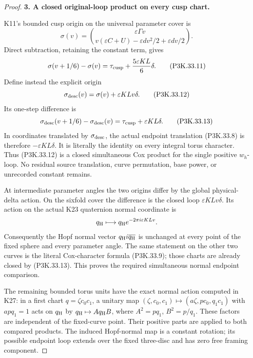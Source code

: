 \begin{proof}
\par\medskip\noindent\textbf{3. A closed original-loop product on every cusp chart.}\enspace

K11's bounded cusp origin on the universal parameter cover is
\[
 \sigma(v)=
 \binom{\varepsilon\Gamma v}
       {v(\varepsilon C+U)-\varepsilon dv^2/2+\varepsilon dv/2}.
\]
Direct subtraction, retaining the constant term, gives
\[
 \sigma(v+1/6)-\sigma(v)
      =\tau_{\rm cusp}+\frac{5\varepsilon KL}{6}\delta. \tag{P3K.33.11}
\]
Define instead the explicit origin
\[
             \sigma_{\rm desc}(v)=\sigma(v)+\varepsilon KLv\delta.
                                                               \tag{P3K.33.12}
\]
Its one-step difference is
\[
 \sigma_{\rm desc}(v+1/6)-\sigma_{\rm desc}(v)
                    =\tau_{\rm cusp}+\varepsilon KL\delta. \tag{P3K.33.13}
\]
In coordinates translated by \(\sigma_{\rm desc}\), the actual
endpoint translation (P3K.33.8) is therefore \(-\varepsilon KL\delta\).
It is literally the identity on every integral torus character.
Thus (P3K.33.12) is a closed simultaneous Cox product for the single
positive \(w_h\)-loop. No residual source translation, curve
permutation, base power, or unrecorded constant remains.

At intermediate parameter angles the two origins differ by the
global physical-delta action. On the sixfold cover the difference
is the closed loop \(\varepsilon KLv\delta\). Its action on the actual K23
quaternion normal coordinate is
\[
             q_{\rm H}\longmapsto
                       q_{\rm H}e^{-2\pi i\varepsilon KLv}.
\]
Consequently the Hopf normal vector
\(q_{\rm H}i\overline{q_{\rm H}}\) is unchanged at every
point of the fixed sphere and every parameter angle. The same
statement on the other two curves is the literal Cox-character
formula (P3K.33.9); those charts are already closed by (P3K.33.13).
This proves the required simultaneous normal endpoint comparison.

The remaining bounded torus units have the exact normal action
computed in K27: in a first chart \(q=\zeta c_0c_1\), a unitary
map \((\zeta,c_0,c_1)\mapsto(a\zeta,pc_0,q_1c_1)\) with
\(apq_1=1\) acts on \(q_{\rm H}\) by
\(q_{\rm H}\mapsto A q_{\rm H}B\), where
\(A^2=pq_1\), \(B^2=p/q_1\). These factors are independent
of the fixed-curve point. Their positive parts are applied to
both compared products. The induced Hopf-normal map is a
constant rotation; its possible endpoint loop extends over the
fixed three-disc and has zero free framing component.


\end{proof}
